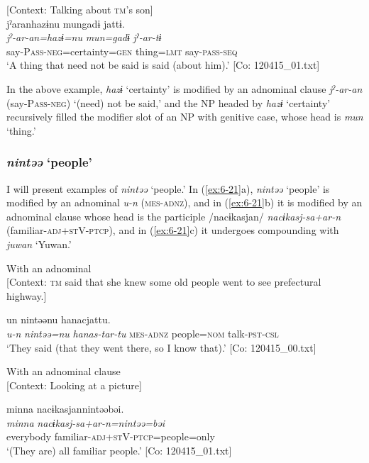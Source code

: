 \ea\label{ex:6-20}
 [Context: Talking about \textsc{tm}’s son]\\

{\TM}
\glll jˀaranhazɨnu  mungadɨ  jattɨ.\\
\textit{jˀ-ar-an=hazɨ=nu}  \textit{mun=gadɨ}  \textit{jˀ-ar-tɨ}\\
    say-P\textsc{ass}-\textsc{neg}=certainty=\textsc{gen}  thing=\textsc{lmt}  say-\textsc{pass}-\textsc{seq}\\
\glt    ‘A thing that need not be said is said (about him).’ [Co: 120415\_01.txt]
\z

In the above example, \textit{hazɨ} ‘certainty’ is modified by an adnominal clause \textit{jˀ-ar-an} (say-P\textsc{ass}-\textsc{neg}) ‘(need) not be said,’ and the NP headed by \textit{hazɨ} ‘certainty’ recursively filled the modifier slot of an NP with genitive case, whose head is \textit{mun} ‘thing.’

\subsubsection{\textit{nintəə} ‘people’}

I will present examples of \textit{nintəə} ‘people.’ In (\ref{ex:6-21}a), \textit{nintəə} ‘people’ is modified by an adnominal \textit{u-n} (\textsc{mes}-\textsc{adnz}), and in (\ref{ex:6-21}b) it is modified by an adnominal clause whose head is the participle /nacɨkasjan/ \textit{nacɨkasj-sa+ar-n} (familiar-\textsc{adj}+\textsc{st}V-\textsc{ptcp}), and in (\ref{ex:6-21}c) it undergoes compounding with \textit{juwan} ‘Yuwan.’

\ea\label{ex:6-21}
\ea With an adnominal\\{}
[Context: \textsc{tm} said that she knew some old people went to see prefectural highway.]

{\TM}
\glll un  nintəənu  hanacjattu.\\
      \textit{u-n}  \textit{nintəə=nu}  \textit{hanas-tar-tu}
      \textsc{mes}-\textsc{adnz}  people=\textsc{nom}  talk-\textsc{pst}-\textsc{csl}\\
\glt ‘They said (that they went there, so I know that).’ [Co: 120415\_00.txt]
\z

\ex With an adnominal clause\\{}
[Context: Looking at a picture]

{\TM}
\glll minna  nacɨkasjannintəəbəi.\\
      \textit{minna}  \textit{nacɨkasj-sa+ar-n=nintəə=bəi}\\
      everybody  familiar-\textsc{adj}+\textsc{st}V-\textsc{ptcp}=people=only\\
\glt ‘(They are) all familiar people.’ [Co: 120415\_01.txt]
\z

